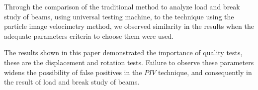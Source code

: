 
Through the comparison of the traditional method 
to analyze load and break study of beams, using universal testing machine, 
to the technique using the particle image velocimetry method,
we observed similarity in the results when the adequate parameters criteria
to choose them were used.

The results shown in this paper demonstrated the importance of quality tests,
these are the displacement and rotation tests. Failure to observe these parameters
widens the possibility of false positives in the $PIV$ technique, and consequently
in the result of load and break study of beams.